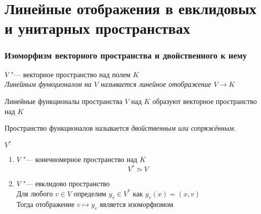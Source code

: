 \part{Линейные отображения в евклидовых и унитарных пространствах}

\section{Изоморфизм векторного пространства и двойственного к нему}

\begin{definition}
	$ V $ "--- векторное пространство над полем $ K $ \\
	\it{Линейным функционалом} на $ V $ называется линейное отображение $ V \to K $
\end{definition}

\begin{property}
	Линейные функционалы пространства $ V $ над $ K $ образуют векторное пространство над $ K $
\end{property}

\begin{definition}
	Пространство функционалов называется \it{двойственным} или \it{сопряжённым}.
\end{definition}

\begin{notation}
	$ V^* $
\end{notation}

\begin{theorem}
	\hfill
	\begin{enumerate}
		\item $ V $ "--- конечномерное пространство над $ K $
		$$ V^* \simeq V $$

		\item $ V $ "--- евклидово пространство \\
		Для любого $ v \in V $ определим $ y_v \in V^* $ как $ y_v(x) = (x, v) $ \\
		Тогда отображение $ v \mapsto y_v $ является изоморфизмом
	\end{enumerate}
\end{theorem}

